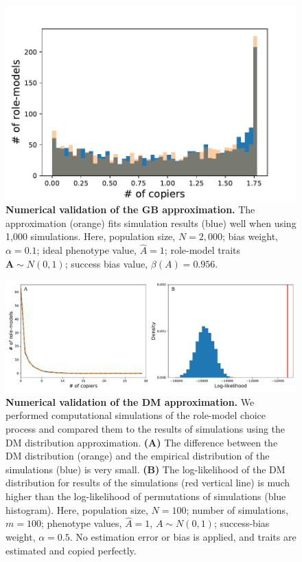 \documentclass[12pt]{extarticle}
\let\vec\mathbf
\begin{document}
\begin{figure}[h]
    \includegraphics[width=0.7\linewidth]{GBD_validation.pdf}
  \caption{
  \textbf{Numerical validation of the GB approximation.}
  The approximation (orange) fits simulation results (blue) well when using 1,000 simulations. 
  Here, population size, $N=2,000$; bias weight, $\alpha=0.1$; {ideal} phenotype value, $\hat{A}=1$; role-model traits $\vec{A} \sim N(0,1)$; success bias value, $\beta(A)=0.956$.}	
  \label{fig:GBD}
\end{figure}


\begin{figure}[h]
    \includegraphics[width=\linewidth]{DM_validation.pdf}
  \caption{
  \textbf{Numerical validation of the DM approximation.}
  We performed computational simulations of the role-model choice process and compared them to the results of simulations using the DM distribution approximation.
  \textbf{(A)} The difference between the DM distribution (orange) and the empirical distribution of the simulations (blue) is very small. 
  \textbf{(B)} The log-likelihood of the DM distribution for results of the simulations (red vertical line) is much higher {than} the log-likelihood of permutations of simulations (blue histogram).
  Here, population size, $N=100$; number of simulations, $m=100$; phenotype values, $\hat{A}=1$, $A \sim N(0,1)$; success-bias weight, $\alpha=0.5$.
  No estimation error or bias is applied, and traits are estimated and copied perfectly.}	
  \label{fig:DM_validation}
\end{figure}
\end{document}
